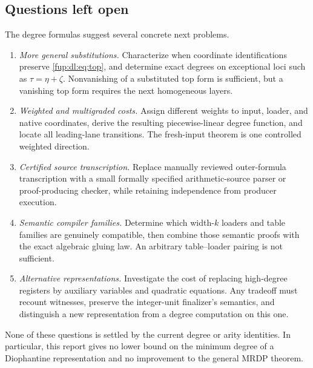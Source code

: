 \documentclass[11pt,letterpaper]{article}
\theoremstyle{definition}\newtheorem{definition}[theorem]{Definition}
\theoremstyle{remark}\newtheorem{remark}[theorem]{Remark}
\begin{document}
\subsection{Questions left open}
The degree formulas suggest several concrete next problems.
\begin{enumerate}
\item \emph{More general substitutions.} Characterize when coordinate identifications preserve \eqref{fup:dl:eq:top}, and determine exact degrees on exceptional loci such as $\tau=\eta+\zeta$. Nonvanishing of a substituted top form is sufficient, but a vanishing top form requires the next homogeneous layers.
\item \emph{Weighted and multigraded costs.} Assign different weights to input, loader, and native coordinates, derive the resulting piecewise-linear degree function, and locate all leading-lane transitions. The fresh-input theorem is one controlled weighted direction.
\item \emph{Certified source transcription.} Replace manually reviewed outer-formula transcription with a small formally specified arithmetic-source parser or proof-producing checker, while retaining independence from producer execution.
\item \emph{Semantic compiler families.} Determine which width-$k$ loaders and table families are genuinely compatible, then combine those semantic proofs with the exact algebraic gluing law. An arbitrary table--loader pairing is not sufficient.
\item \emph{Alternative representations.} Investigate the cost of replacing high-degree registers by auxiliary variables and quadratic equations. Any tradeoff must recount witnesses, preserve the integer-unit finalizer's semantics, and distinguish a new representation from a degree computation on this one.
\end{enumerate}
None of these questions is settled by the current degree or arity identities. In particular, this report gives no lower bound on the minimum degree of a Diophantine representation and no improvement to the general MRDP theorem.
\end{document}
